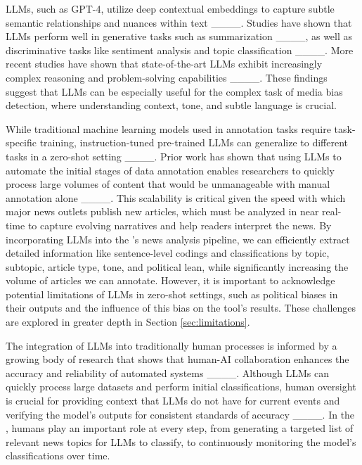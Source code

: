 LLMs, such as GPT-4, utilize deep contextual embeddings to capture subtle semantic relationships and nuances within text ____. Studies have shown that LLMs perform well in generative tasks such as summarization ____, as well as discriminative tasks like sentiment analysis and topic classification ____. More recent studies have shown that state-of-the-art LLMs exhibit increasingly complex reasoning and problem-solving capabilities ____. These findings suggest that LLMs can be especially useful for the complex task of media bias detection, where understanding context, tone, and subtle language is crucial.

While traditional machine learning models used in annotation tasks require task-specific training, instruction-tuned pre-trained LLMs can generalize to different tasks in a zero-shot setting ____. Prior work has shown that using LLMs to automate the initial stages of data annotation enables researchers to quickly process large volumes of content that would be unmanageable with manual annotation alone ____. This scalability is critical given the speed with which major news outlets publish new articles, which must be analyzed in near real-time to capture evolving narratives and help readers interpret the news. By incorporating LLMs into the \mbd's news analysis pipeline, we can efficiently extract detailed information like sentence-level codings and classifications by topic, subtopic, article type, tone, and political lean, while significantly increasing the volume of articles we can annotate. However, it is important to acknowledge potential limitations of LLMs in zero-shot settings, such as political biases in their outputs and the influence of this bias on the tool's results. These challenges are explored in greater depth in Section \ref{sec:limitations}.

The integration of LLMs into traditionally human processes is informed by a growing body of research that shows that human-AI collaboration enhances the accuracy and reliability of automated systems ____. Although LLMs can quickly process large datasets and perform initial classifications, human oversight is crucial for providing context that LLMs do not have for current events and verifying the model's outputs for consistent standards of accuracy ____. In the \mbd, humans play an important role at every step, from generating a targeted list of relevant news topics for LLMs to classify, to continuously monitoring the model's classifications over time.


